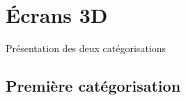 \section{Écrans 3D}
\begin{frame}
Présentation des deux catégorisations
\end{frame}
\subsection{Première catégorisation}